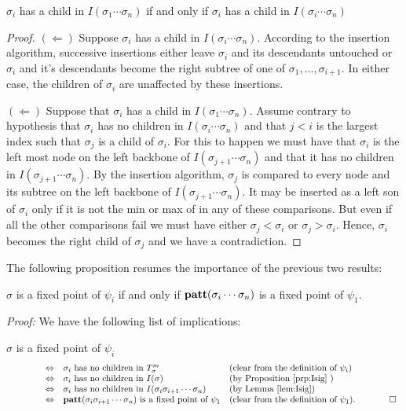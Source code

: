 \begin{lemma}\label{lem:Isig}
$\sigma_i$ has  a child in 
$I(\sigma_1\cdots \sigma_n)$ if and only if $\sigma_i$ has a child
in $I(\sigma_i\cdots \sigma_n)$
\end{lemma}
\begin{proof} $(\Leftarrow)$ Suppose $\sigma_i$ has a child in $I(\sigma_i\cdots
\sigma_n)$.  According to the insertion algorithm, successive insertions 
either leave $\sigma_i$ and its descendants untouched or $\sigma_i$ and
it's descendants become the right subtree of one of $\sigma_1, \ldots, \sigma_{i+1}$. In either case, the children of $\sigma_i$ are unaffected
by these insertions.

\noindent
$(\Leftarrow)$ Suppose that $\sigma_i$ has a child in
$I(\sigma_1\cdots \sigma_n)$.  Assume contrary to
hypothesis that $\sigma_i$ has no children in $I(\sigma_i\cdots \sigma_n)$
and that $j < i$ is the largest index such that $\sigma_j$ is 
a child of $\sigma_i$.  For this to happen we must have that $\sigma_i$ is the left most node on the left 
backbone of $I(\sigma_{j+1}\cdots \sigma_n)$ and that it has 
no children in $I(\sigma_{j+1}\cdots \sigma_n)$.
By the insertion algorithm, $\sigma_j$ is compared to every node  and its subtree on the left backbone of 
$I(\sigma_{j+1}\cdots \sigma_n)$.
It may be inserted as a left son of $\sigma_i$ only if it is not
the 
min or max of in any of these comparisons.  But even if all the other 
comparisons fail we must have either $\sigma_j < \sigma_i$ or $\sigma_j > \sigma_i$.  Hence, $\sigma_i$ becomes the right child of $\sigma_j$
and we have a contradiction. \end{proof}

The following proposition resumes the importance of the previous two results:

 \begin{prop}\label{prp:fixp}
 $\sigma$ is a fixed point of $\psi_i$ if and only if 
 ${\bf patt}(\sigma_i\cdots \sigma_n)$ is a fixed point of $\psi_1$.
 \end{prop}
{\em Proof:}  We have the following list of implications:

$\sigma$   is a fixed point of  $\psi_i$
$$
 \begin{array}{clllr}
 \hspace*{0.99 cm} &   \Leftrightarrow  &  \sigma_i  \mbox{ has no children in }  T^m_\sigma  & (\mbox{clear from the definition of } \psi_i)  & \\
\hspace*{0.99 cm} & \Leftrightarrow & \sigma_i \mbox{ has no children  in } I(\sigma) & (\mbox{by Proposition \ref{prp:Isig} })  &\\
\hspace*{0.99 cm} &  \Leftrightarrow  &  \sigma_i  \mbox{ has no children in }  I(\sigma_i\sigma_{i+1}\cdots \sigma_n)  & (\mbox{by Lemma \ref{lem:Isig}})  &\\
\hspace*{0.99 cm} &  \Leftrightarrow &  {\bf patt}(\sigma_i\sigma_{i+1}\cdots \sigma_n)  \mbox{ is a fixed point of }  \psi_1  & (\mbox{clear from the definition of }  \psi_1 ). 
& \hspace*{0.99 cm} \Box \end{array}
$$ 

